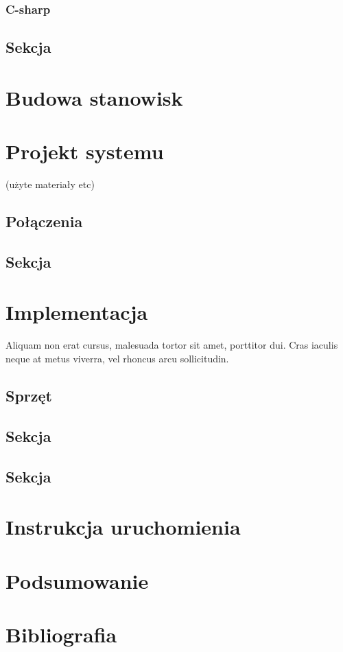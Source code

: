 \documentclass[wmii,inf,mgr]{uwmthesis}
\begin{document}
\subsection{C-sharp}
\section{Sekcja }

\chapter{Budowa stanowisk}
\chapter{Projekt systemu}
(użyte materiały etc)
\section{Połączenia}

\section{Sekcja }

\chapter{Implementacja}

Aliquam non erat cursus, malesuada tortor sit amet, porttitor dui. Cras iaculis neque at metus viverra, vel rhoncus arcu sollicitudin.
\section{Sprzęt }
\section{Sekcja }
\section{Sekcja }
\chapter{Instrukcja uruchomienia}
\chapter{Podsumowanie}
\chapter*{Bibliografia}
\end{document}
